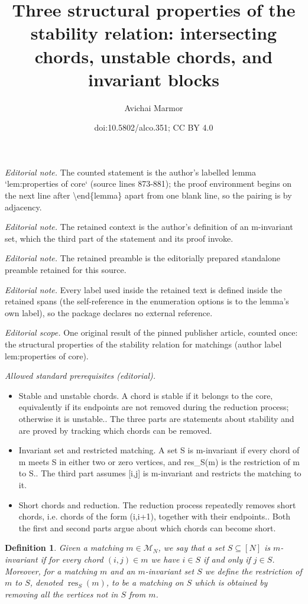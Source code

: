 \documentclass[11pt]{article}
\title{Three structural properties of the stability relation: intersecting chords, unstable chords, and invariant blocks}
\author{Avichai Marmor}
\date{doi:10.5802/alco.351; CC BY 4.0}
\newtheorem{definition}[theo]{Definition}
\theoremstyle{definition}
\numberwithin{equation}{section}
\newcommand{\res}{\operatorname{res}}
\newcommand{\M}{\mathcal{M}}
\begin{document}
\maketitle
\noindent\textit{Editorial note.} The counted statement is the author's labelled lemma `lem:properties of core` (source lines 873-881); the proof environment begins on the next line after \textbackslash{}end\{lemma\} apart from one blank line, so the pairing is by adjacency.\par\medskip
\noindent\textit{Editorial note.} The retained context is the author's definition of an m-invariant set, which the third part of the statement and its proof invoke.\par\medskip
\noindent\textit{Editorial note.} The retained preamble is the editorially prepared standalone preamble retained for this source.\par\medskip
\noindent\textit{Editorial note.} Every label used inside the retained text is defined inside the retained spans (the self-reference in the enumeration options is to the lemma's own label), so the package declares no external reference.\par\medskip
\noindent\textit{Editorial scope.} One original result of the pinned publisher article, counted once: the structural properties of the stability relation for matchings (author label lem:properties of core).\par\medskip
\noindent\textit{Allowed standard prerequisites (editorial).}\begin{itemize}
\item Stable and unstable chords. A chord is stable if it belongs to the core, equivalently if its endpoints are not removed during the reduction process; otherwise it is unstable.. The three parts are statements about stability and are proved by tracking which chords can be removed.
\item Invariant set and restricted matching. A set S is m-invariant if every chord of m meets S in either two or zero vertices, and res\_S(m) is the restriction of m to S.. The third part assumes [i,j] is m-invariant and restricts the matching to it.
\item Short chords and reduction. The reduction process repeatedly removes short chords, i.e. chords of the form (i,i+1), together with their endpoints.. Both the first and second parts argue about which chords can become short.
\end{itemize}\medskip
\begin{definition}
\label{def:restriction of matching}
    Given a matching $m \in \M_N$, we say that a set $S \subseteq [N]$ is $m$-invariant if for every chord $(i,j) \in m$ we have $i \in S$ if and only if $j \in S$. Moreover, for a matching $m$ and an $m$-invariant set $S$ we define the \emph{restriction} of $m$ to $S$, denoted $\res_S(m)$, to be a matching on $S$ which is obtained by removing all the vertices not in $S$ from $m$.
\end{definition}
\end{document}
